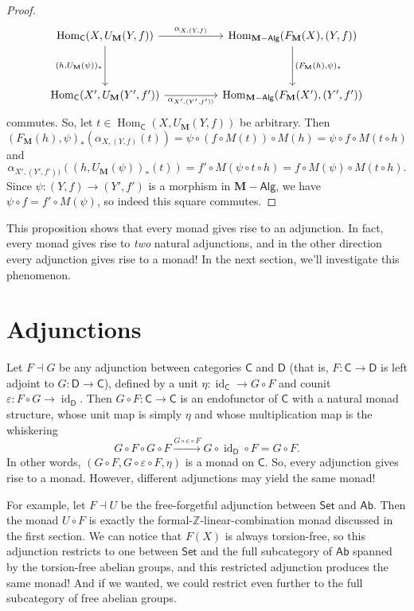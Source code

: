 \documentclass{article}
\theoremstyle{definition}
\newcommand{\C}{\mathsf{C}}
\newcommand{\D}{\mathsf{D}}
\DeclareMathOperator{\id}{id}
\newcommand{\Alg}{\mathsf{Alg}}
\DeclareMathOperator{\Hom}{Hom}
\begin{document}
\begin{proof}
    \[\begin{tikzcd}[ampersand replacement=\&]
    	{\Hom_{\C}(X,U_{\mathbf{M}}(Y,f))} \&\& {\Hom_{\mathbf{M}{-}\Alg}(F_{\mathbf{M}}(X),(Y,f))} \\
    	\\
    	{\Hom_{\C}(X',U_{\mathbf{M}}(Y',f'))} \&\& {\Hom_{\mathbf{M}{-}\Alg}(F_{\mathbf{M}}(X'),(Y',f'))}
    	\arrow["{\alpha_{X,(Y,f)}}", from=1-1, to=1-3]
    	\arrow["{(h,U_{\mathbf{M}}(\psi))_*}"', from=1-1, to=3-1]
    	\arrow["{\alpha_{X',(Y',f'))}}"', from=3-1, to=3-3]
    	\arrow["{(F_{\mathbf{M}}(h),\psi)_*}", from=1-3, to=3-3]
    \end{tikzcd}\]
    commutes. So, let $t \in {\Hom_{\C}(X,U_{\mathbf{M}}(Y,f))}$ be arbitrary. Then
    \[(F_{\mathbf{M}}(h),\psi)_*(\alpha_{X,(Y,f)}(t)) = \psi \circ (f \circ M(t)) \circ M(h) = \psi \circ f \circ M(t \circ h)\]
    and
    \[\alpha_{X',(Y',f'))}((h,U_{\mathbf{M}}(\psi))_*(t)) = f' \circ M(\psi \circ t \circ h) = f \circ M(\psi) \circ M(t \circ h).\]
    Since $\psi : (Y,f) \to (Y',f')$ is a morphism in $\mathbf{M}{-}\Alg$, we have $\psi \circ f = f' \circ M(\psi)$, so indeed this square commutes.
\end{proof}

This proposition shows that every monad gives rise to an adjunction. In fact, every monad gives rise to \emph{two} natural adjunctions, and in the other direction every adjunction gives rise to a monad! In the next section, we'll investigate this phenomenon.

\section{Adjunctions}

Let $F \dashv G$ be any adjunction between categories $\C$ and $\D$ (that is, $F : \C \to \D$ is left adjoint to $G : \D \to \C$), defined by a unit $\eta : \id_{\C} \to G \circ F$ and counit $\varepsilon : F \circ G \to \id_{\D}$. Then $G \circ F : \C \to \C$ is an endofunctor of $\C$ with a natural monad structure, whose unit map is simply $\eta$ and whose multiplication map is the whiskering
\[G \circ F \circ G \circ F \xrightarrow{G \circ \varepsilon \circ F} G \circ \id_{\D} \circ F = G \circ F.\]
In other words, $(G \circ F, G \circ \varepsilon \circ F, \eta)$ is a monad on $\C$. So, every adjunction gives rise to a monad. However, different adjunctions may yield the same monad!

For example, let $F \dashv U$ be the free-forgetful adjunction between $\mathsf{Set}$ and $\mathsf{Ab}$. Then the monad $U \circ F$ is exactly the formal-$\mathbb{Z}$-linear-combination monad discussed in the first section. We can notice that $F(X)$ is always torsion-free, so this adjunction restricts to one between $\mathsf{Set}$ and the full subcategory of $\mathsf{Ab}$ spanned by the torsion-free abelian groups, and this restricted adjunction produces the same monad! And if we wanted, we could restrict even further to the full subcategory of free abelian groups.
\end{document}
